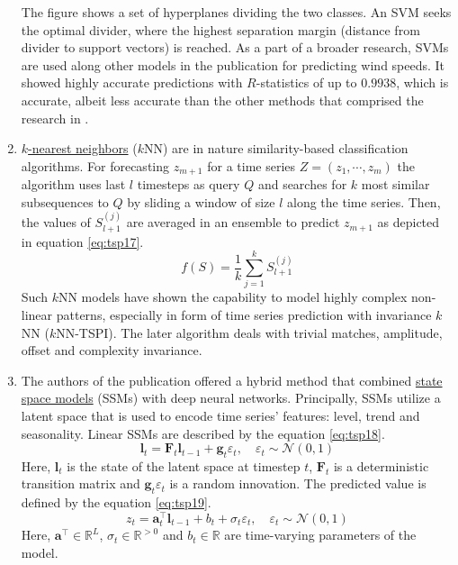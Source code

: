 \documentclass[3p,times,procedia]{elsarticle}
\begin{document}
\begin{enumerate}
The figure shows a set of hyperplanes dividing the two classes. An SVM seeks the optimal divider, where the highest separation margin (distance from divider to support vectors) is reached.
As a part of a broader research, SVMs are used along other models in the publication \cite{khosravi2018time} for predicting wind speeds. It showed highly accurate predictions with $R$-statistics of up to $0.9938$, which is accurate, albeit less accurate than the other methods that comprised the research in \cite{khosravi2018time}. 
\item \underline{$k$-nearest neighbors} ($k$NN) are in nature similarity-based classification algorithms. For forecasting $z_{m+1}$ for a time series $Z = (z_1, \cdots, z_m)$ the algorithm uses last $l$ timesteps as query $Q$ and searches for $k$ most similar subsequences to $Q$ by sliding a window of size $l$ along the time series. Then, the values of $S_{l+1}^{(j)}$ are averaged in an ensemble to predict $z_{m+1}$ as depicted in equation \ref{eq:tsp17}.
\begin{equation} \label{eq:tsp17}
f(S) = \frac{1}{k} \sum_{j=1}^k S_{l+1}^{(j)}
\end{equation}
Such $k$NN models have shown the capability to model highly complex non-linear patterns, especially in form of time series prediction with invariance $k$NN ($k$NN-TSPI). The later algorithm deals with trivial matches, amplitude, offset and complexity invariance.
\item The authors of the publication \cite{rangapuram2018deep} offered a hybrid method that combined \underline{state space models} (SSMs) with deep neural networks. Principally, SSMs utilize a latent space that is used to encode time series' features: level, trend and seasonality. Linear SSMs are described by the equation \ref{eq:tsp18}.
\begin{equation} \label{eq:tsp18}
\mathbf{l}_t = \mathbf{F}_t\mathbf{l}_{t-1} + \mathbf{g}_t \varepsilon_t, \quad \varepsilon_t \sim \mathcal{N} (0,1)
\end{equation}
Here, $\mathbf{l}_t$ is the state of the latent space at timestep $t$, $\mathbf{F}_t$ is a deterministic transition matrix and $\mathbf{g}_t \varepsilon_t$ is a random innovation. The predicted value is defined by the equation \ref{eq:tsp19}.
\begin{equation} \label{eq:tsp19}
z_t = \mathbf{a}_t^\top \mathbf{l}_{t-1} + b_t + \sigma_t \varepsilon_t, \quad \varepsilon_t \sim \mathcal{N} (0,1)
\end{equation}
Here, $\mathbf{a}^\top \in \mathbb{R}^L$, $\sigma_t \in\mathbb{R}^{>0}$ and $b_t \in \mathbb{R}$ are time-varying parameters of the model.

\end{enumerate}
\end{document}
